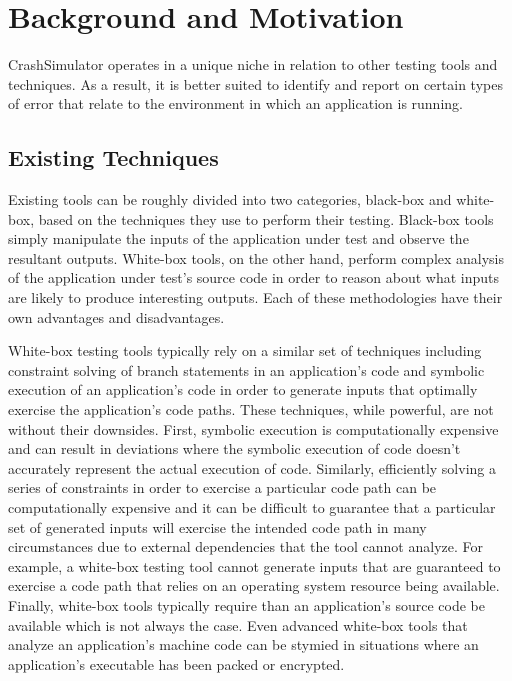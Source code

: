 \section{Background and Motivation}

    CrashSimulator operates in a unique niche in relation to other testing tools and techniques. As a result, it is
    better suited to identify and report on certain types of error that relate to the environment in which an
    application is running.

    \subsection{Existing Techniques}

        Existing tools can be roughly divided into two categories, black-box and white-box, based on the techniques they
        use to perform their testing. Black-box tools simply manipulate the inputs of the application under test and
        observe the resultant outputs. White-box tools, on the other hand, perform complex analysis of the application
        under test's source code in order to reason about what inputs are likely to produce interesting outputs. Each of
        these methodologies have their own advantages and disadvantages.

        White-box testing tools typically rely on a similar set of techniques including constraint solving of branch
        statements in an application's code and symbolic execution of an application's code in order to generate inputs
        that optimally exercise the application's code paths. These techniques, while powerful, are not without their
        downsides.  First, symbolic execution is computationally expensive and can result in deviations where the
        symbolic execution of code doesn't accurately represent the actual execution of code.  Similarly, efficiently
        solving a series of constraints in order to exercise a particular code path can be computationally expensive and
        it can be difficult to guarantee that a particular set of generated inputs will exercise the intended code path
        in many circumstances due to external dependencies that the tool cannot analyze. For example, a white-box
        testing tool cannot generate inputs that are guaranteed to exercise a code path that relies on an operating
        system resource being available. Finally, white-box tools typically require than an application's source code be
        available which is not always the case. Even advanced white-box tools that analyze an application's machine code
        can be stymied in situations where an application's executable has been packed or encrypted.

